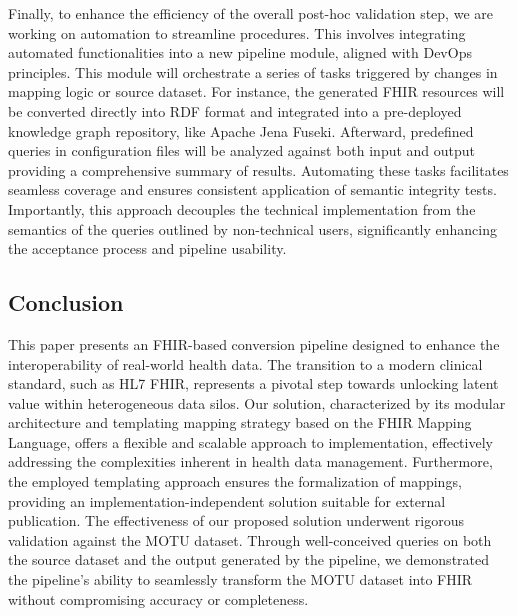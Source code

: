 Finally, to enhance the efficiency of the overall post-hoc validation step, we are working on automation to streamline procedures. This involves integrating automated functionalities into a new pipeline module, aligned with DevOps principles. This module will orchestrate a series of tasks triggered by changes in mapping logic or source dataset. For instance, the generated FHIR resources will be converted directly into RDF format and integrated into a pre-deployed knowledge graph repository, like Apache Jena Fuseki. Afterward, predefined queries in configuration files will be analyzed against both input and output providing a comprehensive summary of results.
Automating these tasks facilitates seamless coverage and ensures consistent application of semantic integrity tests. Importantly, this approach decouples the technical implementation from the semantics of the queries outlined by non-technical users, significantly enhancing the acceptance process and pipeline usability.

\subsection{Conclusion}\label{sec:paper2_conclusion}
This paper presents an FHIR-based conversion pipeline designed to enhance the interoperability of real-world health data. The transition to a modern clinical standard, such as HL7 FHIR, represents a pivotal step towards unlocking latent value within heterogeneous data silos. Our solution, characterized by its modular architecture and templating mapping strategy based on the FHIR Mapping Language, offers a flexible and scalable approach to implementation, effectively addressing the complexities inherent in health data management. Furthermore, the employed templating approach ensures the formalization of mappings, providing an implementation-independent solution suitable for external publication. 
The effectiveness of our proposed solution underwent rigorous validation against the MOTU dataset. Through well-conceived queries on both the source dataset and the output generated by the pipeline, we demonstrated the pipeline's ability to seamlessly transform the MOTU dataset into FHIR without compromising accuracy or completeness.  

